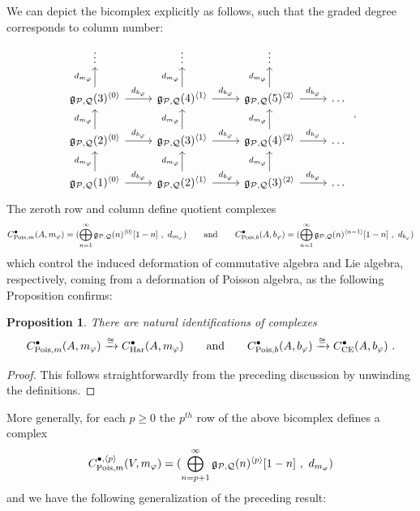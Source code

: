 \documentclass[11pt]{amsart}
\numberwithin{equation}{section}
\newtheorem{prop}[theo]{Proposition}
\theoremstyle{definition}
\newcommand{\mc}{\mathcal}
\newcommand{\mf}{\mathfrak}
\newcommand{\Pois}{{\textup{Pois}}}
\newcommand{\0}{{\textbf{0}}}
\newcommand{\g}{{\mf{g}}}
\def \mf{\mathfrak}
\begin{document}
We can depict the bicomplex explicitly as follows, such that the graded degree corresponds to column number:
\begin{equation}\label{Poisdecompeqn}
\begin{tikzcd} \vdots & \vdots & \vdots &  \\
	\g_{\mc P,\mc Q}(3)^{\langle 0 \rangle} \ar[r,"d_{b_\varphi} "] \ar[u,"d_{m_\varphi}"] & \g_{\mc P,\mc Q}(4)^{\langle 1 \rangle} \ar[r,"d_{b_\varphi} "] \ar[u,"d_{m_\varphi}"] & \g_{\mc P,\mc Q}(5)^{\langle 2 \rangle} \ar[r,"d_{b_\varphi} "] \ar[u,"d_{m_\varphi}"]  & \hdots  \\
	\g_{\mc P,\mc Q}(2)^{\langle 0 \rangle}\ar[r,"d_{b_\varphi} "] \ar[u,"d_{m_\varphi}"] &  	\g_{\mc P,\mc Q}(3)^{\langle 1 \rangle} \ar[r,"d_{b_\varphi} "] \ar[u,"d_{m_\varphi}"] & 	\g_{\mc P,\mc Q}(4)^{\langle 2 \rangle}\ar[r,"d_{b_\varphi} "] \ar[u,"d_{m_\varphi}"] & \hdots\\
	\g_{\mc P,\mc Q}(1)^{\langle 0 \rangle} \ar[r,"d_{b_\varphi} "] \ar[u,"d_{m_\varphi}"]& 	\g_{\mc P,\mc Q}(2)^{\langle 1 \rangle}\ar[r,"d_{b_\varphi} "] \ar[u,"d_{m_\varphi}"] & 	\g_{\mc P,\mc Q}(3)^{\langle 2 \rangle}\ar[r,"d_{b_\varphi} "] \ar[u,"d_{m_\varphi}"] & \hdots
\end{tikzcd}  \ . 
\end{equation}
The zeroth row and column define quotient complexes
\[ C^\bullet_{\Pois,m}(A,m_\varphi)=(\bigoplus_{n=1}^\infty \g_{\mc P,\mc Q}(n)^{\langle 0 \rangle}[1-n] \ , \ d_{m_\varphi} ) \qquad \text{and}\qquad C^\bullet_{\Pois,b}(A,b_\varphi)=(\bigoplus_{n=1}^\infty \g_{\mc P,\mc Q}(n)^{\langle n-1 \rangle}[1-n] \ , \ d_{b_\varphi} )  \]
which control the induced deformation of commutative algebra and Lie algebra, respectively, coming from a deformation of Poisson algebra, as the following Proposition confirms:

\begin{prop}\label{rowcol1prop}There are natural identifications of complexes
\[C^\bullet_{\Pois,m}(A,m_\varphi) \xrightarrow{\cong} C^\bullet_{\textup{Har}}(A,m_\varphi) \qquad \text{and}\qquad  C^\bullet_{\Pois,b}(A,b_\varphi) \xrightarrow{\cong} C^\bullet_{\textup{CE}}(A,b_\varphi)  \ . \]
\end{prop}
\begin{proof} This follows straightforwardly from the preceding discussion by unwinding the definitions.

\end{proof}

More generally, for each $p\geq 0$ the $p^{th}$ row of the above bicomplex defines a complex
\[ C^{\bullet,\langle p \rangle}_{\Pois,m}(V,m_\varphi)=(\bigoplus_{n=p+1}^\infty \g_{\mc P,\mc Q}(n)^{\langle p \rangle}[1-n] \ , \ d_{m_\varphi} ) \]
and we have the following generalization of the preceding result:
\end{document}

